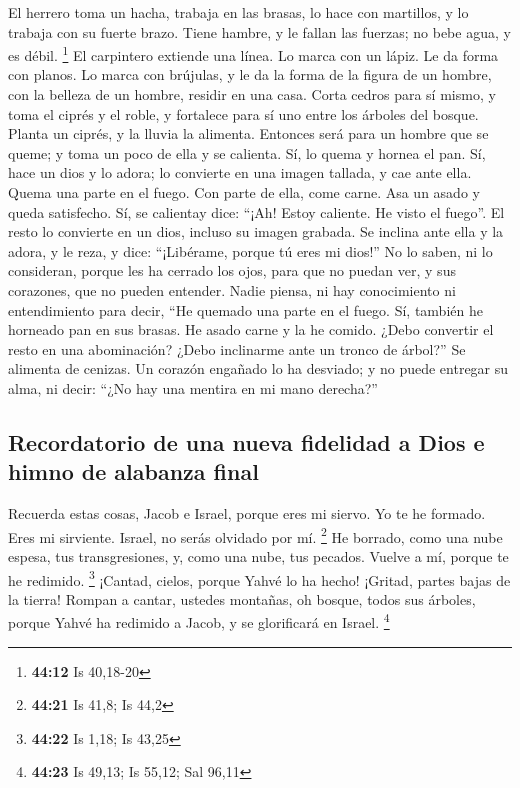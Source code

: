  El herrero toma un hacha, trabaja en las brasas, lo hace
con martillos, y lo trabaja con su fuerte brazo. Tiene hambre, y le
fallan las fuerzas; no bebe agua, y es débil. \footnote{\textbf{44:12}
  Is 40,18-20}  El carpintero extiende una línea. Lo
marca con un lápiz. Le da forma con planos. Lo marca con brújulas, y le
da la forma de la figura de un hombre, con la belleza de un hombre,
residir en una casa.  Corta cedros para sí mismo, y toma
el ciprés y el roble, y fortalece para sí uno entre los árboles del
bosque. Planta un ciprés, y la lluvia la alimenta. 
Entonces será para un hombre que se queme; y toma un poco de ella y se
calienta. Sí, lo quema y hornea el pan. Sí, hace un dios y lo adora; lo
convierte en una imagen tallada, y cae ante ella.  Quema
una parte en el fuego. Con parte de ella, come carne. Asa un asado y
queda satisfecho. Sí, se calientay dice: ``¡Ah! Estoy caliente. He visto
el fuego''.  El resto lo convierte en un dios, incluso su
imagen grabada. Se inclina ante ella y la adora, y le reza, y dice:
``¡Libérame, porque tú eres mi dios!''  No lo saben, ni
lo consideran, porque les ha cerrado los ojos, para que no puedan ver, y
sus corazones, que no pueden entender.  Nadie piensa, ni
hay conocimiento ni entendimiento para decir, ``He quemado una parte en
el fuego. Sí, también he horneado pan en sus brasas. He asado carne y la
he comido. ¿Debo convertir el resto en una abominación? ¿Debo inclinarme
ante un tronco de árbol?''  Se alimenta de cenizas. Un
corazón engañado lo ha desviado; y no puede entregar su alma, ni decir:
``¿No hay una mentira en mi mano derecha?''

\hypertarget{recordatorio-de-una-nueva-fidelidad-a-dios-e-himno-de-alabanza-final}{%
\subsection{Recordatorio de una nueva fidelidad a Dios e himno de
alabanza
final}\label{recordatorio-de-una-nueva-fidelidad-a-dios-e-himno-de-alabanza-final}}

 Recuerda estas cosas, Jacob e Israel, porque eres mi
siervo. Yo te he formado. Eres mi sirviente. Israel, no serás olvidado
por mí. \footnote{\textbf{44:21} Is 41,8; Is 44,2}  He
borrado, como una nube espesa, tus transgresiones, y, como una nube, tus
pecados. Vuelve a mí, porque te he redimido. \footnote{\textbf{44:22} Is
  1,18; Is 43,25}  ¡Cantad, cielos, porque Yahvé lo ha
hecho! ¡Gritad, partes bajas de la tierra! Rompan a cantar, ustedes
montañas, oh bosque, todos sus árboles, porque Yahvé ha redimido a
Jacob, y se glorificará en Israel. \footnote{\textbf{44:23} Is 49,13; Is
  55,12; Sal 96,11}

